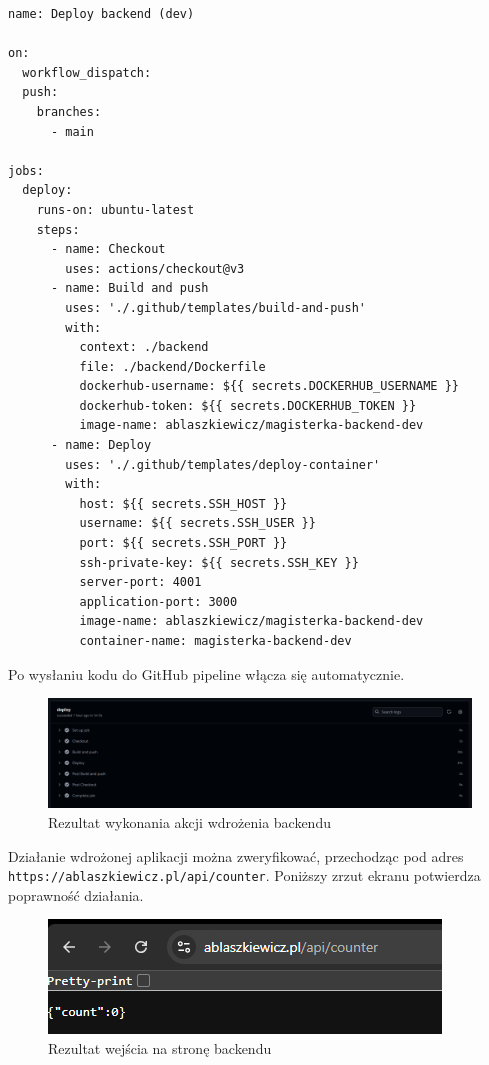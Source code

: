 \documentclass{article}
\begin{document}
\begin{lstlisting}[caption=Plik \texttt{.github/workflows/dev-deploy-backend.yml}]
name: Deploy backend (dev)

on:
  workflow_dispatch:
  push:
    branches:
      - main

jobs:
  deploy:
    runs-on: ubuntu-latest
    steps:
      - name: Checkout
        uses: actions/checkout@v3
      - name: Build and push
        uses: './.github/templates/build-and-push'
        with:
          context: ./backend
          file: ./backend/Dockerfile
          dockerhub-username: ${{ secrets.DOCKERHUB_USERNAME }}
          dockerhub-token: ${{ secrets.DOCKERHUB_TOKEN }}
          image-name: ablaszkiewicz/magisterka-backend-dev
      - name: Deploy
        uses: './.github/templates/deploy-container'
        with:
          host: ${{ secrets.SSH_HOST }}
          username: ${{ secrets.SSH_USER }}
          port: ${{ secrets.SSH_PORT }}
          ssh-private-key: ${{ secrets.SSH_KEY }}
          server-port: 4001
          application-port: 3000
          image-name: ablaszkiewicz/magisterka-backend-dev
          container-name: magisterka-backend-dev

\end{lstlisting}

Po wysłaniu kodu do GitHub pipeline włącza się automatycznie.

\begin{figure}[H]
    \centering
    \includegraphics[width=1\linewidth]{pierwszaAkcjaBackendu.png}
    \caption{Rezultat wykonania akcji wdrożenia backendu}
    \label{fig:enter-label}
\end{figure}

Działanie wdrożonej aplikacji można zweryfikować, przechodząc pod adres \lstinline|https://ablaszkiewicz.pl/api/counter|. Poniższy zrzut ekranu potwierdza poprawność działania.

\begin{figure}[H]
    \centering
    \includegraphics[width=1\linewidth]{rezultatPierwszejWizytyPodBackend.png}
    \caption{Rezultat wejścia na stronę backendu}
    \label{fig:enter-label}
\end{figure}
\end{document}
